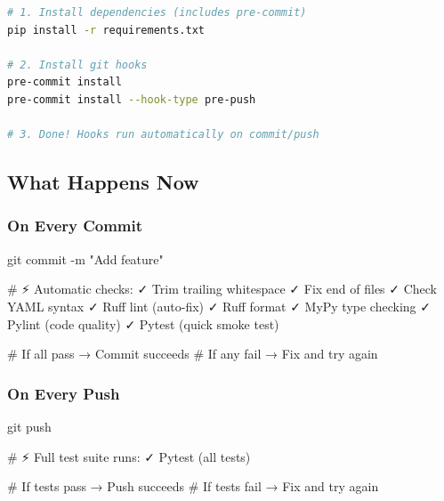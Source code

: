 \begin{record}

\begin{lstlisting}[language=bash]
# 1. Install dependencies (includes pre-commit)
pip install -r requirements.txt

# 2. Install git hooks
pre-commit install
pre-commit install --hook-type pre-push

# 3. Done! Hooks run automatically on commit/push
\end{lstlisting}

\end{record}

\subsection{What Happens Now}\label{cr:app:archive-pre-commit-setup-summary:what-happens-now}

\subsubsection{On Every Commit}\label{cr:app:archive-pre-commit-setup-summary:on-every-commit}

\begin{record}

\begin{textblock}
git commit -m "Add feature"

# ⚡ Automatic checks:
✓ Trim trailing whitespace
✓ Fix end of files
✓ Check YAML syntax
✓ Ruff lint (auto-fix)
✓ Ruff format
✓ MyPy type checking
✓ Pylint (code quality)
✓ Pytest (quick smoke test)

# If all pass → Commit succeeds
# If any fail → Fix and try again
\end{textblock}

\end{record}

\subsubsection{On Every Push}\label{cr:app:archive-pre-commit-setup-summary:on-every-push}

\begin{record}

\begin{textblock}
git push

# ⚡ Full test suite runs:
✓ Pytest (all tests)

# If tests pass → Push succeeds
# If tests fail → Fix and try again
\end{textblock}

\end{record}

